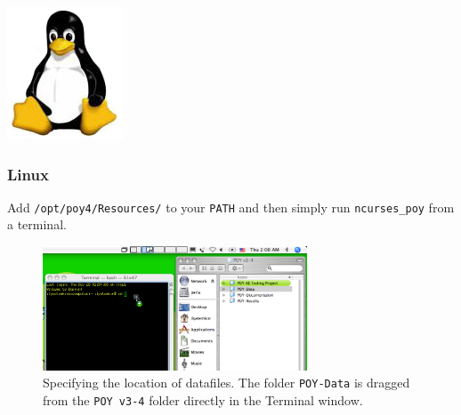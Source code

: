 \begin{flushleft}
	\begin{minipage}[c]{0.075\textwidth}
   		\includegraphics[width=\textwidth]{figures/figLogoLinux.jpg}
	\end{minipage}
	\quad
	\begin{minipage}[t]{0.89\textwidth}
	   	\subsubsection{Linux}
	\end{minipage}
    Add \texttt{/opt/poy4/Resources/} to your \texttt{PATH} and then simply run
    \texttt{ncurses\_poy} from a terminal.
\end{flushleft}

\begin{figure}[htbp]
   \centering
   \includegraphics[width=0.7\textwidth]{figures/figprelim1.jpg}
   \caption{Specifying the location of datafiles. The folder \texttt{POY-Data} is dragged from the \texttt{POY v3-4} folder directly in the Terminal window.}
   \label{fig:figprelim1}
\end{figure}


